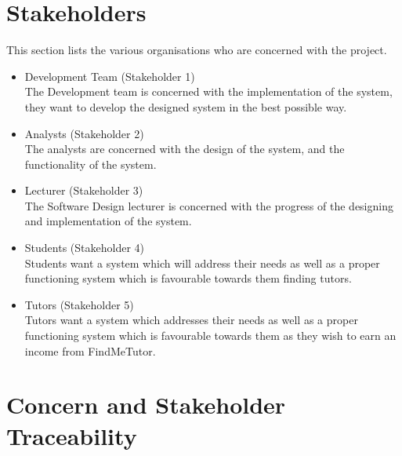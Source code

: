 \documentclass[12pt]{article}
\begin{document}
\pagebreak

\section{Stakeholders}
This section lists the various organisations who are concerned with the project.
\begin{itemize}

\item Development Team (Stakeholder 1)\\
The Development team is concerned with the implementation of the system, they want to develop the designed system in the best possible way.

\item Analysts (Stakeholder 2)\\
The analysts are concerned with the design of the system, and the functionality of the system.

\item Lecturer (Stakeholder 3)\\
The Software Design lecturer is concerned with the progress of the designing and implementation of the system.

\item Students (Stakeholder 4)\\
Students want a system which will address their needs as well as a proper functioning system which is favourable towards them finding tutors.

\item Tutors (Stakeholder 5)\\
Tutors want a system which addresses their needs as well as a proper functioning system which is favourable towards them as they wish to earn an income from FindMeTutor.
\end{itemize}

\pagebreak

\section{Concern and Stakeholder Traceability}
\end{document}
